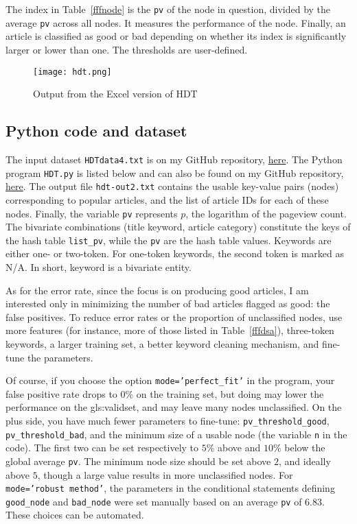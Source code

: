 \documentclass[oneside,10pt]{book}
\begin{document}
The index in Table~\ref{fffnode} is the \texttt{pv} of the node in question, divided by the average \texttt{pv} across all nodes. It measures the performance of the node. Finally, an article is classified as good or bad depending on whether its index is significantly larger or lower than one. The thresholds are user-defined.


\begin{figure}%
\centering
\texttt{[image: hdt.png]}
\caption{Output from the Excel version of HDT}
\label{fig:hdt}
\end{figure}



\subsection{Python code and dataset}\label{pythourew}


The input dataset \texttt{HDTdata4.txt} is on my GitHub repository, \href{https://github.com/VincentGranville/Machine-Learning/blob/main/Source\%20Code/HDTdata4.txt}{here}. The Python program \texttt{HDT.py} is listed below and can also be found on my GitHub repository, \href{https://github.com/VincentGranville/Machine-Learning/blob/main/Source\%20Code/HDT.py}{here}. The output file \texttt{hdt-out2.txt} contains the usable key-value pairs (nodes) corresponding to popular articles, and the list of article IDs for each of these nodes. Finally, the variable \texttt{pv} represents $p$, the logarithm of the pageview count. The bivariate combinations (title keyword, article category)  constitute the
 keys of the hash table \texttt{list\_pv}, while the \texttt{pv} are the hash table values. Keywords are either one- or two-token. For one-token keywords, the second token is marked as N/A. In short, keyword is a bivariate entity.

As for the error rate, since the focus is on producing good articles, I am interested only in minimizing the number of bad articles flagged as good: the false positives.  To reduce error rates or the proportion of unclassified nodes, use more features (for instance, more of those listed in Table~\ref{fffdsa}), three-token keywords, a larger training set, a better keyword cleaning mechanism, and fine-tune the parameters.

Of course, if you choose the option \texttt{mode='perfect\_fit'} in the program, your false positive rate drops to $0\%$ on the training set, but doing may lower the
 performance on the \gls{gls:validset}, and may leave many nodes unclassified.  On the plus side, you have much fewer parameters to fine-tune:
 \texttt{pv\_threshold\_good}, \texttt{pv\_threshold\_bad}, and the minimum size of a usable node (the variable \texttt{n} in the code). The first two can be set respectively to $5\%$ above and
$10\%$ below
 the global average \texttt{pv}. The minimum node size should be set above $2$, and ideally above $5$, though a large value results in more unclassified nodes.
 For \texttt{mode='robust method'}, the
 parameters in the conditional statements defining \texttt{good\_node} and \texttt{bad\_node} were set manually based on an average \texttt{pv} of $6.83$. These choices can be automated.
\end{document}
